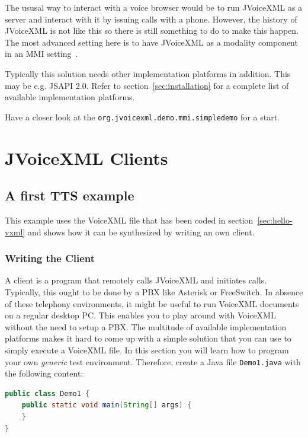 \documentclass[11pt,a4paper]{book}
\begin{document}
The ususal way to interact with a voice browser would be to run JVoiceXML as a
server and interact with it by issuing calls with a phone. However, the history
of JVoiceXML is not like this so there is still something to do to make this
happen. The most advanced setting here is to have JVoiceXML as a modality
component in an MMI setting~\cite{w3c:mmi}.

Typically this solution needs other implementation platforms in addition. This
may be e.g. JSAPI 2.0. Refer to section~\ref{sec:installation} for a complete
list of available implementation platforms.

Have a closer look at the \lstinline{org.jvoicexml.demo.mmi.simpledemo} for a
start.

\chapter{JVoiceXML Clients}
\label{cha:programmatic-approach}

\section{A first TTS example}
\label{sec:first-tts-example}

This example uses the VoiceXML file that has been coded in
section~\ref{sec:hello-vxml} and shows how it can be synthesized by writing an
own client. 

\subsection{Writing the Client}

A client is a program that remotely calls JVoiceXML and initiates calls.
Typically, this ought to be done by a PBX like Asterisk or FreeSwitch. In
absence of these telephony environments, it might be useful to run
VoiceXML documents on a regular desktop PC. This enables you to play around with
VoiceXML without the need to setup a PBX. The multitude of available
implementation platforms makes it hard to come up with a simple solution that
you can use to simply execute a VoiceXML file. In this section you will learn
how to program your own \emph{generic} test environment. Therefore, create a
Java file \texttt{Demo1.java} with the following content:

\begin{lstlisting}[language=Java]
public class Demo1 {
    public static void main(String[] args) {
    }
}
\end{lstlisting}
\end{document}
